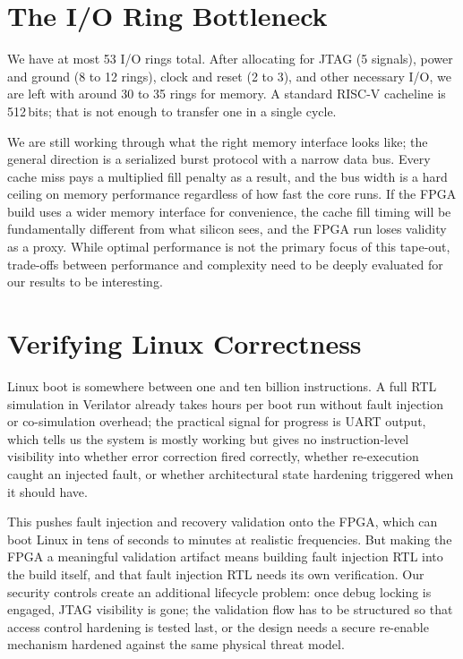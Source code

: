 \documentclass[12pt]{article}
\begin{document}
\section{The I/O Ring Bottleneck}

We have at most 53 I/O rings total. After allocating for JTAG (5
signals), power and ground (8 to 12 rings), clock and reset (2 to 3),
and other necessary I/O, we are left with around 30 to 35 rings for
memory. A standard RISC-V cacheline is 512\,bits; that is not enough
to transfer one in a single cycle.

We are still working through what the right memory interface looks like;
the general direction is a serialized burst protocol with a narrow data
bus. Every cache miss pays a multiplied fill penalty as a result, and
the bus width is a hard ceiling on memory performance regardless of how
fast the core runs. If the FPGA build uses a wider memory interface for
convenience, the cache fill timing will be fundamentally different from
what silicon sees, and the FPGA run loses validity as a proxy. While
optimal performance is not the primary focus of this tape-out,
trade-offs between performance and complexity need to be deeply evaluated
for our results to be interesting.

\section{Verifying Linux Correctness}

Linux boot is somewhere between one and ten billion instructions. A full
RTL simulation in Verilator already takes hours per boot run without
fault injection or co-simulation overhead; the practical signal for
progress is UART output, which tells us the system is mostly working
but gives no instruction-level visibility into whether error correction
fired correctly, whether re-execution caught an injected fault, or
whether architectural state hardening triggered when it should have.

This pushes fault injection and recovery validation onto the FPGA, which
can boot Linux in tens of seconds to minutes at realistic frequencies.
But making the FPGA a meaningful validation artifact means building fault
injection RTL into the build itself, and that fault injection RTL needs
its own verification. Our security controls create an additional
lifecycle problem: once debug locking is engaged, JTAG visibility is
gone; the validation flow has to be structured so that access control
hardening is tested last, or the design needs a secure re-enable
mechanism hardened against the same physical threat model.
\end{document}
